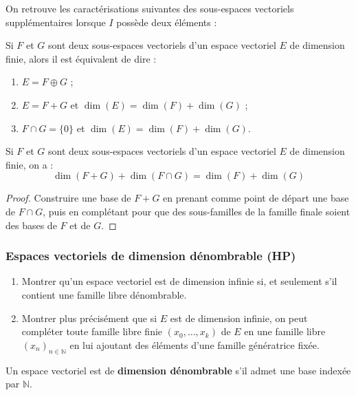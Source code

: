 \documentclass[french]{article}
\newcommand{\N}{\mathbb{N}}
\theoremstyle{plain}
\theoremstyle{definition}
\theoremstyle{remark}
\begin{document}
On retrouve les caractérisations suivantes des sous-espaces vectoriels supplémentaires lorsque $I$ possède deux éléments :

\begin{thm}%
	Si $F$ et $G$ sont deux sous-espaces vectoriels d'un espace vectoriel $E$ de dimension finie, alors il est équivalent de dire :
	\begin{enumerate}[label=(\roman*)]
		\item $E=F\oplus G$ ;
		\item $E=F+G$ et $\dim(E)=\dim(F)+\dim(G)$ ;
		\item $F\cap G=\{0\}$ et $\dim(E)=\dim(F)+\dim(G)$.
	\end{enumerate}
\end{thm}

\begin{prop}%
	Si $F$ et $G$ sont deux sous-espaces vectoriels d'un espace vectoriel $E$ de dimension finie, on a : $$\dim(F+G)+\dim(F\cap G)=\dim(F)+\dim(G)$$
\end{prop}
\begin{proof}
	Construire une base de $F+G$ en prenant comme point de départ une base de $F\cap G$, puis en complétant pour que des sous-familles de la famille finale soient des bases de $F$ et de $G$.
\end{proof}

\subsubsection*{Espaces vectoriels de dimension dénombrable (HP)}

\begin{exo}
	\begin{enumerate}
		\item Montrer qu'un espace vectoriel est de dimension infinie si, et seulement s'il contient une famille libre dénombrable.
		\item Montrer plus précisément que si $E$ est de dimension infinie, on peut compléter toute famille libre finie $(x_0,\ldots,x_k)$ de $E$ en une famille libre $(x_n)_{n\in\N}$ en lui ajoutant des éléments d'une famille génératrice fixée.
	\end{enumerate}
\end{exo}

\begin{dfn}
	Un espace vectoriel est de \textbf{dimension dénombrable} s'il admet une base indexée par $\N$.
\end{dfn}
\end{document}
